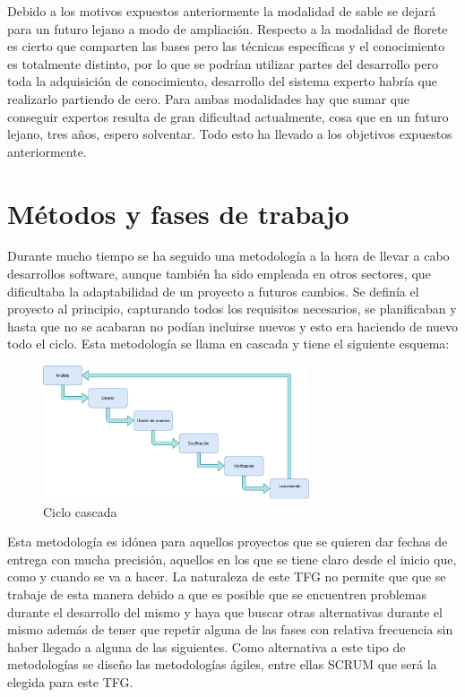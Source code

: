 \documentclass[11pt,a4paper,twoside,final]{article}
\begin{document}
\medskip
Debido a los motivos expuestos anteriormente la modalidad de sable se dejará para un futuro lejano a modo
 de ampliación. Respecto a la modalidad de florete es cierto que comparten las bases pero las técnicas
 específicas y el conocimiento es totalmente distinto, por lo que se podrían utilizar partes del desarrollo
 pero toda la adquisición de conocimiento, desarrollo del sistema experto habría que realizarlo partiendo
 de cero. Para ambas modalidades hay que sumar que conseguir expertos resulta de gran dificultad actualmente,
 cosa que en un futuro lejano, tres años, espero solventar. Todo esto ha llevado a los objetivos expuestos anteriormente.

\newpage

\section{Métodos y fases de trabajo}

Durante mucho tiempo se ha seguido una metodología a la hora de llevar a cabo desarrollos software,
 aunque también ha sido empleada en otros sectores, que dificultaba la adaptabilidad de un proyecto
 a futuros cambios. Se definía el proyecto al principio, capturando todos los requisitos necesarios,
 se planificaban y hasta que no se acabaran no podían incluirse nuevos y esto era haciendo de nuevo
 todo el ciclo. Esta metodología se llama en cascada y tiene el siguiente esquema:

\begin{figure}[H]
  \centering
   \includegraphics[width=0.7\textwidth]{Cascada.pdf}
   \caption{Ciclo cascada}
  \label{Ciclo cascada}
\end{figure}

Esta metodología es idónea para aquellos proyectos que se quieren dar fechas de entrega con mucha precisión,
 aquellos en los que se tiene claro desde el inicio que, como y cuando se va a hacer. La naturaleza de
 este TFG no permite que que se trabaje de esta manera debido a que es posible que se encuentren problemas
 durante el desarrollo del mismo y haya que buscar otras alternativas durante el mismo además de tener
 que repetir alguna de las fases con relativa frecuencia sin haber llegado a alguna de las siguientes.
 Como alternativa a este tipo de metodologías se diseño las metodologías ágiles, entre ellas
 SCRUM \cite{scrum} que será la elegida para este TFG.
\end{document}
